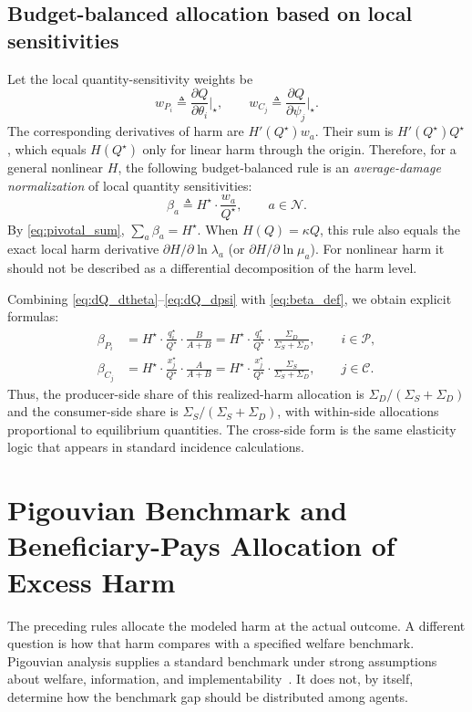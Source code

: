 \documentclass[journal, a4paper]{IEEEtran}
\begin{document}
\subsection{Budget-balanced allocation based on local sensitivities}
Let the local quantity-sensitivity weights be
\begin{equation}
w_{P_i}\triangleq \frac{\partial Q}{\partial \theta_i}\Big|_\star,\qquad
w_{C_j}\triangleq \frac{\partial Q}{\partial \psi_j}\Big|_\star.
\end{equation}
The corresponding derivatives of harm are $H'(Q^\star)w_a$. Their sum is $H'(Q^\star)Q^\star$, which equals $H(Q^\star)$ only for linear harm through the origin. Therefore, for a general nonlinear $H$, the following budget-balanced rule is an \emph{average-damage normalization} of local quantity sensitivities:
\begin{equation}
\beta_a \triangleq H^\star\cdot \frac{w_a}{Q^\star},\qquad a\in\mathcal{N}.
\label{eq:beta_def}
\end{equation}
By \eqref{eq:pivotal_sum}, $\sum_a\beta_a=H^\star$. When $H(Q)=\kappa Q$, this rule also equals the exact local harm derivative $\partial H/\partial\ln\lambda_a$ (or $\partial H/\partial\ln\mu_a$). For nonlinear harm it should not be described as a differential decomposition of the harm level.

Combining \eqref{eq:dQ_dtheta}--\eqref{eq:dQ_dpsi} with \eqref{eq:beta_def}, we obtain explicit formulas:
\begin{align}
\beta_{P_i}
&=
H^\star\cdot \frac{q_i^\star}{Q^\star}\cdot \frac{B}{A+B}
=
H^\star\cdot \frac{q_i^\star}{Q^\star}\cdot \frac{\Sigma_D}{\Sigma_S+\Sigma_D},
\qquad i\in\mathcal{P},
\label{eq:beta_prod}\\
\beta_{C_j}
&=
H^\star\cdot \frac{x_j^\star}{Q^\star}\cdot \frac{A}{A+B}
=
H^\star\cdot \frac{x_j^\star}{Q^\star}\cdot \frac{\Sigma_S}{\Sigma_S+\Sigma_D},
\qquad j\in\mathcal{C}.
\label{eq:beta_cons}
\end{align}
Thus, the producer-side share of this realized-harm allocation is $\Sigma_D/(\Sigma_S+\Sigma_D)$ and the consumer-side share is $\Sigma_S/(\Sigma_S+\Sigma_D)$, with within-side allocations proportional to equilibrium quantities. The cross-side form is the same elasticity logic that appears in standard incidence calculations.

\section{Pigouvian Benchmark and Beneficiary-Pays Allocation of Excess Harm}
The preceding rules allocate the modeled harm at the actual outcome. A different question is how that harm compares with a specified welfare benchmark. Pigouvian analysis supplies a standard benchmark under strong assumptions about welfare, information, and implementability~\cite{Pigou1932,Baumol1972}. It does not, by itself, determine how the benchmark gap should be distributed among agents.
\end{document}
